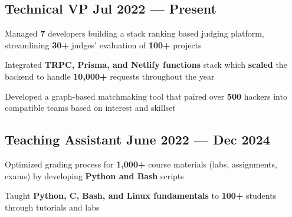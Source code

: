 \subsection{{Technical VP \hfill Jul 2022 --- Present}}
\begin{zitemize}
    \item Managed \textbf{7} developers building a stack ranking based judging platform, streamlining \textbf{30+} judges' evaluation of \textbf{100+} projects
    \item Integrated \textbf{TRPC, Prisma, and Netlify functions} stack which \textbf{scaled} the backend to handle \textbf{10,000+} requests throughout the year
    \item Developed a graph-based matchmaking tool that paired over \textbf{500} hackers into compatible teams based on interest and skillset
\end{zitemize}


\subsection{{Teaching Assistant \hfill June 2022 --- Dec 2024}}
\begin{zitemize}
    \item Optimized grading process for \textbf{1,000+} course materials (labs, assignments, exams) by developing \textbf{Python and Bash} scripts
    \item Taught \textbf{Python, C, Bash, and Linux fundamentals} to \textbf{100+} students through tutorials and labs
\end{zitemize}





